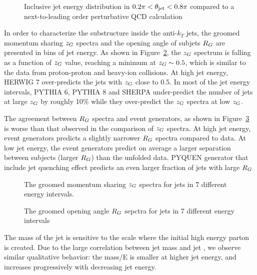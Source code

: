 \begin{figure}[htp!]
    \centering
    \caption{Inclusive jet energy distribution in $0.2\pi<\theta_{\rm jet}<0.8 \pi$ compared to a next-to-leading order perturbative QCD calculation}
    \label{Figure:Result-JetEnergyJoao}
\end{figure}


\clearpage

In order to characterize the substructure inside the anti-$k_T$ jets, the groomed momentum sharing $z_G$ spectra and the opening angle of subjets $R_G$ are presented in bins of jet energy. As shown in Figure~\ref{Figure:Result-JetZG}, the $z_G$ spectrum is falling as a function of $z_G$ value, reaching a minimum at $z_G\sim 0.5$, which is similar to the data from proton-proton and heavy-ion collisions. At high jet energy, HERWIG 7 over-predicts the jets with $z_G$ close to 0.5. In most of the jet energy intervals, PYTHIA 6, PYTHIA 8 and SHERPA under-predict the number of jets at large $z_G$ by roughly 10\% while they over-predict the $z_G$ spectra at low $z_G$. 

The agreement between $R_G$ spectra and event generators, as shown in Figure~\ref{Figure:Result-JetRG} is worse than that observed in the comparison of $z_G$ spectra. At high jet energy, event generators predicts a slightly narrower $R_G$ spectra compared to data. At low jet energy, the event generators predict on average a larger separation between subjects (larger $R_G$) than the unfolded data. PYQUEN generator that include jet quenching effect predicts an even larger fraction of jets with large $R_G$

\begin{figure}[htp!]
    \centering
    \caption{The groomed momentum sharing $z_G$ spectra for jets in 7 different energy intervals.}
    \label{Figure:Result-JetZG}
\end{figure}


\begin{figure}[htp!]
    \centering
    \caption{The groomed opening angle $R_G$ sepctra for jets in 7 different energy intervals}
    \label{Figure:Result-JetRG}
\end{figure}

\clearpage

The mass of the jet is sensitive to the scale where the initial high energy parton is created.  Due to the large correlation between jet mass and jet \Rg, we observe similar qualitative behavior: the mass/E is smaller at higher jet energy, and increases progressively with decreasing jet energy.

